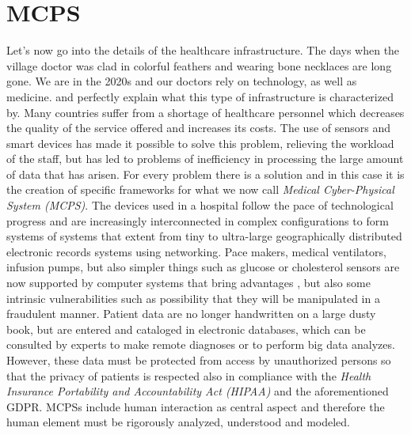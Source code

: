 \section{MCPS}
Let's now go into the details of the healthcare infrastructure. The days when the village doctor was clad in colorful feathers and wearing bone necklaces are long gone. We are in the 2020s and our doctors rely on technology, as well as medicine. \cite{Nair2019} and \cite{Dey2018} perfectly explain what this type of infrastructure is characterized by. Many countries suffer from a shortage of healthcare personnel which decreases the quality of the service offered and increases its costs. The use of sensors and smart devices has made it possible to solve this problem, relieving the workload of the staff, but has led to problems of inefficiency in processing the large amount of data that has arisen. For every problem there is a solution and in this case it is the creation of specific frameworks for what we now call \textit{Medical Cyber-Physical System (MCPS)}. The devices used in a hospital follow the pace of technological progress and are increasingly interconnected in complex configurations to form systems of systems that extent from tiny to ultra-large geographically distributed electronic records systems using networking. Pace makers, medical ventilators, infusion pumps, but also simpler things such as glucose or cholesterol sensors are now supported by computer systems that bring advantages , but also some intrinsic vulnerabilities such as possibility that they will be manipulated in a fraudulent manner. Patient data are no longer handwritten on a large dusty book, but are entered and cataloged in electronic databases, which can be consulted by experts to make remote diagnoses or to perform big data analyzes. However, these data must be protected from access by unauthorized persons so that the privacy of patients is respected also in compliance with the \textit{Health Insurance Portability and Accountability Act (HIPAA)} and the aforementioned GDPR. MCPSs include human interaction as central aspect and therefore the human element must be rigorously analyzed, understood and modeled.
